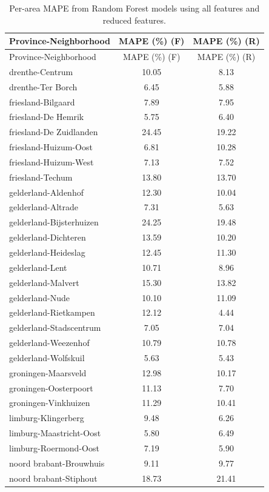 \begin{longtable}{lcc}
\caption{Per-area MAPE from Random Forest models using all features and reduced features.} \label{tab:ml_results} \\
\hline
Province-Neighborhood & MAPE (\%) (F) & MAPE (\%) (R) \\
\hline
\endfirsthead
\hline
Province-Neighborhood & MAPE (\%) (F) & MAPE (\%) (R) \\
\hline
\endhead
drenthe-Centrum & 10.05 & 8.13 \\
drenthe-Ter Borch & 6.45 & 5.88 \\
friesland-Bilgaard & 7.89 & 7.95 \\
friesland-De Hemrik & 5.75 & 6.40 \\
friesland-De Zuidlanden & 24.45 & 19.22 \\
friesland-Huizum-Oost & 6.81 & 10.28 \\
friesland-Huizum-West & 7.13 & 7.52 \\
friesland-Techum & 13.80 & 13.70 \\
gelderland-Aldenhof & 12.30 & 10.04 \\
gelderland-Altrade & 7.31 & 5.63 \\
gelderland-Bijsterhuizen & 24.25 & 19.48 \\
gelderland-Dichteren & 13.59 & 10.20 \\
gelderland-Heideslag & 12.45 & 11.30 \\
gelderland-Lent & 10.71 & 8.96 \\
gelderland-Malvert & 15.30 & 13.82 \\
gelderland-Nude & 10.10 & 11.09 \\
gelderland-Rietkampen & 12.12 & 4.44 \\
gelderland-Stadscentrum & 7.05 & 7.04 \\
gelderland-Weezenhof & 10.79 & 10.78 \\
gelderland-Wolfskuil & 5.63 & 5.43 \\
groningen-Maarsveld & 12.98 & 10.17 \\
groningen-Oosterpoort & 11.13 & 7.70 \\
groningen-Vinkhuizen & 11.29 & 10.41 \\
limburg-Klingerberg & 9.48 & 6.26 \\
limburg-Maastricht-Oost & 5.80 & 6.49 \\
limburg-Roermond-Oost & 7.19 & 5.90 \\
noord brabant-Brouwhuis & 9.11 & 9.77 \\
noord brabant-Stiphout & 18.73 & 21.41 \\

\end{longtable}
